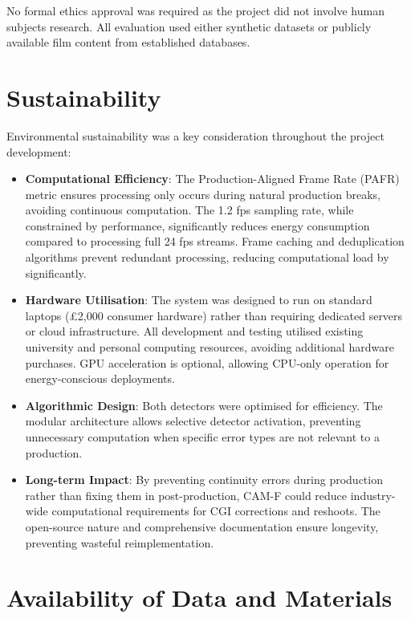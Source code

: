 No formal ethics approval was required as the project did not involve human subjects research. All evaluation used either synthetic datasets or publicly available film content from established databases.

\section*{Sustainability}

Environmental sustainability was a key consideration throughout the project development:

\begin{itemize}
    \item \textbf{Computational Efficiency}: The Production-Aligned Frame Rate (PAFR) metric ensures processing only occurs during natural production breaks, avoiding continuous computation. The 1.2 fps sampling rate, while constrained by performance, significantly reduces energy consumption compared to processing full 24 fps streams. Frame caching and deduplication algorithms prevent redundant processing, reducing computational load by significantly.
    
    \item \textbf{Hardware Utilisation}: The system was designed to run on standard laptops (£2,000 consumer hardware) rather than requiring dedicated servers or cloud infrastructure. All development and testing utilised existing university and personal computing resources, avoiding additional hardware purchases. GPU acceleration is optional, allowing CPU-only operation for energy-conscious deployments.
    
    \item \textbf{Algorithmic Design}: Both detectors were optimised for efficiency. The modular architecture allows selective detector activation, preventing unnecessary computation when specific error types are not relevant to a production.
    
    \item \textbf{Long-term Impact}: By preventing continuity errors during production rather than fixing them in post-production, CAM-F could reduce industry-wide computational requirements for CGI corrections and reshoots. The open-source nature and comprehensive documentation ensure longevity, preventing wasteful reimplementation.
\end{itemize}

\section*{Availability of Data and Materials}

